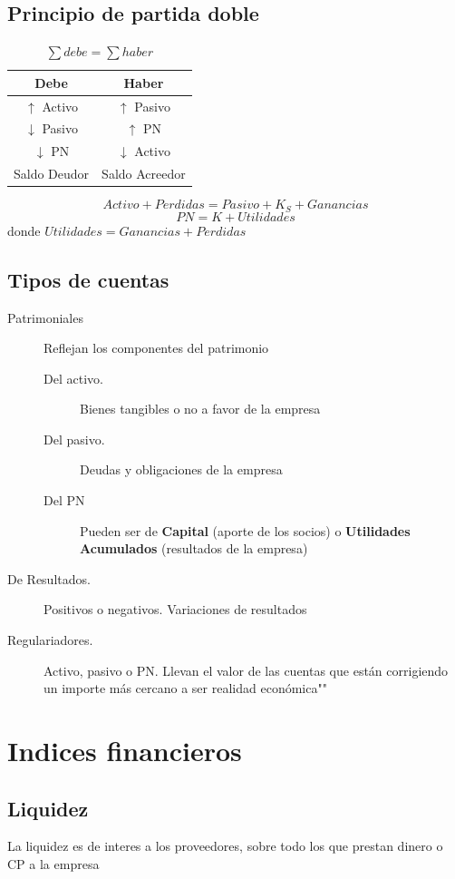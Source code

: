 \documentclass[twocolumn,10pt]{article}
\begin{document}
\subsection{Principio de partida doble}

\begin{table}[h!]
	\centering
	\begin{tabular}{c|c}
		Debe & Haber \\ \hline
		$\uparrow$ Activo &$\uparrow$ Pasivo \\
		$\downarrow$ Pasivo & $\uparrow$ PN \\
		$\downarrow$ PN & $\downarrow$ Activo \\ \hline
		Saldo Deudor & Saldo Acreedor 
	\end{tabular}
\caption{$\sum debe = \sum haber$}
\end{table}
\[
Activo + Perdidas = Pasivo + K_S + Ganancias 
\]
\[
PN = K + Utilidades
\]
donde $Utilidades = Ganancias + Perdidas$

\subsection{Tipos de cuentas}
\begin{description}
	\item[Patrimoniales] Reflejan los componentes del patrimonio
	\begingroup
	\small
	\begin{description}
		\item[Del activo.] Bienes tangibles o no a favor de la empresa
		\item[Del pasivo.]  Deudas y obligaciones de la empresa
		\item[Del PN] Pueden ser de \textbf{Capital} (aporte de los socios) o  \textbf{Utilidades Acumulados} (resultados de la empresa)
	\end{description}
\endgroup
\item[De Resultados.] Positivos o negativos. Variaciones de resultados
\item[Regulariadores.] Activo, pasivo o PN. Llevan el valor de las cuentas que están corrigiendo un importe más cercano a ser realidad económica""
\end{description}

\section{Indices financieros}

\subsection{Liquidez}
La liquidez es de interes a los proveedores, sobre todo los que prestan dinero o CP a la empresa
\end{document}
